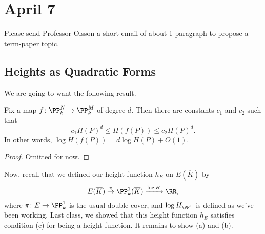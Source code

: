 \documentclass[../notes.tex]{subfiles}
\begin{document}
\section{April 7}

Please send Professor Olsson a short email of about 1 paragraph to propose a term-paper topic.

\subsection{Heights as Quadratic Forms}
We are going to want the following result.
\begin{theorem} \label{thm:height-move-proj}
	Fix a map $f\colon\PP^N_k\to\PP^M_k$ of degree $d$. Then there are constants $c_1$ and $c_2$ such that
	\[c_1H(P)^d\le H(f(P))\le c_2H(P)^d.\]
	In other words, $\log H(f(P))=d\log H(P)+O(1)$.
\end{theorem}
\begin{proof}
	Omitted for now.
\end{proof}
Now, recall that we defined our height function $h_E$ on $E(\overline K)$ by
\[E(\overline K)\stackrel\pi\to\PP^1_k(\overline K)\xrightarrow{\log H}\RR,\]
where $\pi\colon E\to\PP^1_k$ is the usual double-cover, and $\log H_{\PP^1}$ is defined as we've been working. Last class, we showed that this height function $h_E$ satisfies condition (c) for being a height function. It remains to show (a) and (b).
\end{document}
